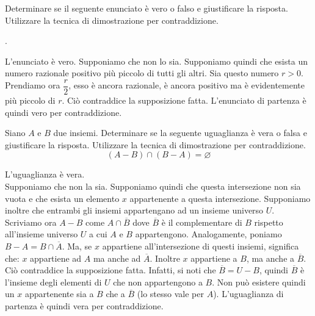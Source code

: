
\begin{esercizio}
Determinare se il seguente enunciato è vero o falso e giustificare la risposta. Utilizzare la tecnica di dimostrazione per contraddizione.
\begin{center} 
    .
\end{center}
\end{esercizio}

\begin{soluzione}
L'enunciato è vero. Supponiamo che non lo sia.  Supponiamo quindi che esista un numero razionale positivo più piccolo di tutti gli altri. Sia questo numero $r > 0$. Prendiamo ora $\dfrac{r}{2}$, esso è ancora razionale, è ancora positivo ma è evidentemente più piccolo di $r$.  Ciò contraddice la supposizione fatta. L'enunciato di partenza è quindi vero per contraddizione. \\
\end{soluzione}


\begin{esercizio}
Siano $A$ e $B$ due insiemi.  Determinare se la seguente uguaglianza è vera o falsa e giustificare la risposta. Utilizzare la tecnica di dimostrazione per contraddizione.
    $$(A - B) \cap (B - A) = \varnothing$$
\end{esercizio}

\begin{soluzione}
L'uguaglianza è vera.\\
Supponiamo che non la sia.
Supponiamo quindi che questa intersezione non sia vuota e che esista un elemento $x$ appartenente a questa intersezione.
Supponiamo inoltre che entrambi gli insiemi appartengano ad un insieme universo $U$.
Scriviamo ora $A-B$ come $A \cap \overline{B}$ dove $\overline{B}$ è il complementare di $B$ rispetto all'insieme universo $U$ a cui $A$ e $B$ appartengono.
Analogamente, poniamo $B-A=B \cap \overline{A}$. Ma, se $x$ appartiene all'intersezione di questi insiemi, significa che: $x$ appartiene ad $A$ ma anche ad $\overline{A}$.
Inoltre $x$ appartiene a $B$, ma anche a $\overline{B}$. Ciò contraddice la supposizione fatta. 
Infatti, si noti che $\overline{B} = U-B$, quindi $\overline{B}$ è l'insieme degli elementi di $U$ che non appartengono a $B$. 
Non può esistere quindi un $x$ appartenente sia a $B$ che a $\overline{B}$  (lo stesso vale per $A$).
L'uguaglianza di partenza è quindi vera per contraddizione. \\
\end{soluzione}

